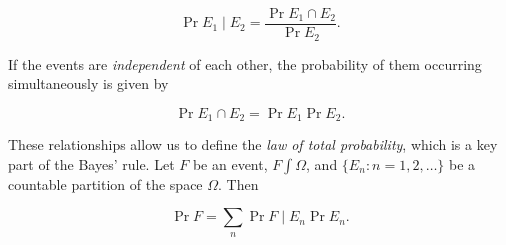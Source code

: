 $$
\Pr{E_1 \mid E_2} = \frac{\Pr{E_1 \cap E_2}}{\Pr{E_2}}.
$$

If the events are \textit{independent} of each other, the probability of them occurring simultaneously is given by

$$
\Pr{E_1 \cap E_2} = \Pr{E_1}\Pr{E_2}.
$$

These relationships allow us to define the \textit{law of total probability}\cite[31]{zwillinger_crc_2000}, which is a key part of the Bayes' rule. Let $F$ be an event, $F \int \Omega$, and $\{E_n : n = 1, 2, \ldots\}$ be a countable partition of the space $\Omega$. Then

$$
\Pr{F} = \sum_n \Pr{F \mid E_n} \Pr{E_n}.
$$

